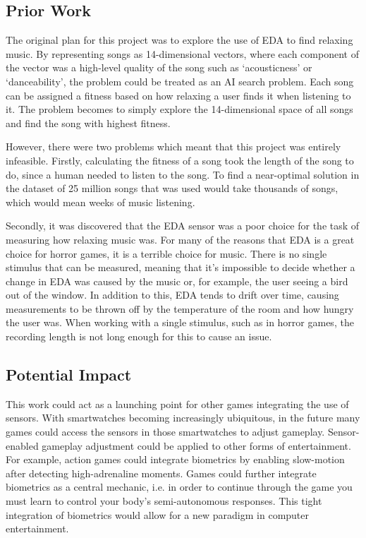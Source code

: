 \documentclass[12pt,a4paper]{article}
\begin{document}
\subsection{Prior Work}
The original plan for this project was to explore the use of EDA to find relaxing music. By representing songs as 14-dimensional vectors, where each component of the vector was a high-level quality of the song such as `acousticness' or `danceability', the problem could be treated as an AI search problem. Each song can be assigned a fitness based on how relaxing a user finds it when listening to it. The problem becomes to simply explore the 14-dimensional space of all songs and find the song with highest fitness.

However, there were two problems which meant that this project was entirely infeasible. Firstly, calculating the fitness of a song took the length of the song to do, since a human needed to listen to the song. To find a near-optimal solution in the dataset of 25 million songs that was used would take thousands of songs, which would mean weeks of music listening.

Secondly, it was discovered that the EDA sensor was a poor choice for the task of measuring how relaxing music was. For many of the reasons that EDA is a great choice for horror games, it is a terrible choice for music. There is no single stimulus that can be measured, meaning that it's impossible to decide whether a change in EDA was caused by the music or, for example, the user seeing a bird out of the window. In addition to this, EDA tends to drift over time, causing measurements to be thrown off by the temperature of the room and how hungry the user was. When working with a single stimulus, such as in horror games, the recording length is not long enough for this to cause an issue.

\subsection{Potential Impact}
This work could act as a launching point for other games integrating the use of sensors. With smartwatches becoming increasingly ubiquitous, in the future many games could access the sensors in those smartwatches to adjust gameplay. Sensor-enabled gameplay adjustment could be applied to other forms of entertainment. For example, action games could integrate biometrics by enabling slow-motion after detecting high-adrenaline moments. Games could further integrate biometrics as a central mechanic, i.e. in order to continue through the game you must learn to control your body's semi-autonomous responses. This tight integration of biometrics would allow for a new paradigm in computer entertainment.
\end{document}
